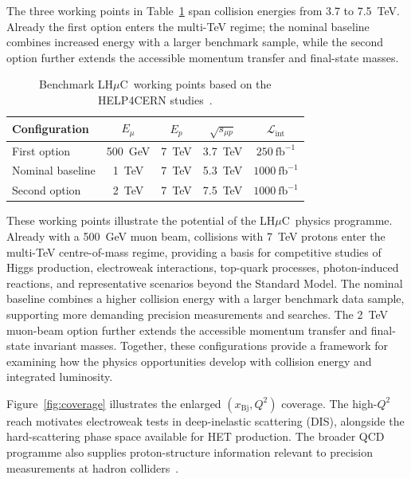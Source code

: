 \documentclass[a4paper,11pt]{article}
\newcommand{\lhmuc}{LH$\mu$C}
\begin{document}
The three working points in Table~\ref{tab:benchmarks} span collision energies 
from 3.7 to 7.5~TeV. Already the first option enters the multi-TeV regime; 
the nominal baseline combines increased energy with a larger benchmark sample, 
while the second option further extends the accessible momentum transfer and final-state masses. 


\begin{table}[htbp]
\centering
\small
\setlength{\tabcolsep}{6pt}
\renewcommand{\arraystretch}{1.18}
\begin{tabular}{lcccc}
\toprule
Configuration & $E_\mu$ & $E_p$ & $\sqrt{s_{\mu p}}$ & $\mathcal{L}_{\mathrm{int}}$\\
\midrule
First option & 500~GeV & 7~TeV & 3.7~TeV & $250~\mathrm{fb}^{-1}$\\
Nominal baseline & 1~TeV & 7~TeV & 5.3~TeV & $1000~\mathrm{fb}^{-1}$\\
Second option & 2~TeV & 7~TeV & 7.5~TeV & $1000~\mathrm{fb}^{-1}$\\
\bottomrule
\end{tabular}
\caption{Benchmark \lhmuc\ working points based on the HELP4CERN
studies~\cite{HELP4CERN}.}
\label{tab:benchmarks}
\end{table}

These working points illustrate the potential of the \lhmuc\ physics
programme. Already with a 500~GeV muon beam, collisions with 7~TeV
protons enter the multi-TeV centre-of-mass regime, providing a basis
for competitive studies of Higgs production, electroweak interactions,
top-quark processes, photon-induced reactions, and representative
scenarios beyond the Standard Model. The nominal baseline combines
a higher collision energy with a larger benchmark data sample,
supporting more demanding precision measurements and searches.
The 2~TeV muon-beam option further extends the accessible momentum
transfer and final-state invariant masses. Together, these
configurations provide a framework for examining how the physics
opportunities develop with collision energy and integrated luminosity. 

Figure~\ref{fig:coverage} illustrates the enlarged $(x_{\mathrm{Bj}},Q^2)$ coverage. 
The high-$Q^2$ reach motivates electroweak tests in deep-inelastic scattering (DIS), 
alongside the hard-scattering phase space available for HET production. 
The broader QCD programme also supplies proton-structure information relevant 
to precision measurements at hadron colliders~\cite{Ahmadova:2025vzd}. 
\end{document}
